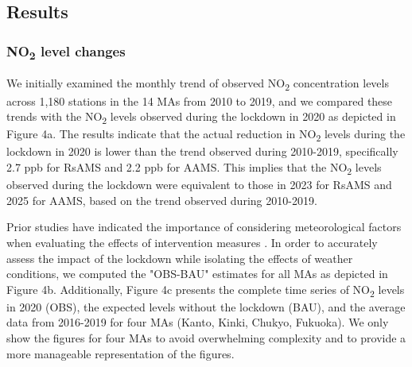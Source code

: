 \subsection{Results} \label{chap4_result}
\subsubsection*{NO\textsubscript{2} level changes}
We initially examined the monthly trend of observed NO\textsubscript{2} concentration levels across 1,180 stations in the 14 MAs from 2010 to 2019, and we compared these trends with the NO\textsubscript{2} levels observed during the lockdown in 2020 as depicted in Figure 4a. The results indicate that the actual reduction in NO\textsubscript{2} levels during the lockdown in 2020 is lower than the trend observed during 2010-2019, specifically 2.7 ppb for RsAMS and 2.2 ppb for AAMS. This implies that the NO\textsubscript{2} levels observed during the lockdown were equivalent to those in 2023 for RsAMS and 2025 for AAMS, based on the trend observed during 2010-2019. \par

Prior studies have indicated the importance of considering meteorological factors when evaluating the effects of intervention measures \citep{ordonez2020early,grange2021covid,shi2021abrupt}. In order to accurately assess the impact of the lockdown while isolating the effects of weather conditions, we computed the "OBS-BAU" estimates for all MAs as depicted in Figure 4b. Additionally, Figure 4c presents the complete time series of NO\textsubscript{2} levels in 2020 (OBS), the expected levels without the lockdown (BAU), and the average data from 2016-2019 for four MAs (Kanto, Kinki, Chukyo, Fukuoka). We only show the figures for four MAs to avoid overwhelming complexity and to provide a more manageable representation of the figures. \par

